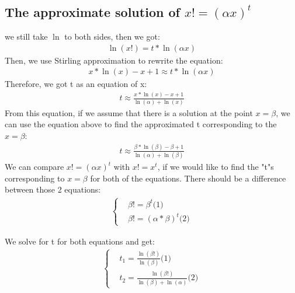\documentclass{article}
\begin{document}
        \subsection{The approximate solution of $x! = (\alpha x) ^ {t}$}
        we still take $\ln$ to both sides, then we got:
            \begin{align*}
               \ln(x!) = t * \ln(\alpha x)
            \end{align*}
        Then, we use Stirling approximation to rewrite the equation:
            \begin{align*}
               x * \ln(x) - x + 1 \approx t * \ln(\alpha x)
            \end{align*}
        Therefore, we got t as an equation of x:
            \begin{align*}
               t \approx \frac{x * \ln(x) - x + 1}{\ln(\alpha) + \ln(x)}
            \end{align*}
        From this equation, if we assume that there is a solution at the point $x = \beta$, we can use the equation above to find the approximated t corresponding to the $x = \beta$:
            \begin{align*}
               t \approx \frac{\beta * \ln(\beta) - \beta + 1}{\ln(\alpha) + \ln(\beta)}
            \end{align*}
        We can compare $x! = (\alpha x) ^ {t}$ with $x! = x ^ {t}$, if we would like to find the "t"s corresponding to $x = \beta$ for both of the equations. There should be a difference between those 2 equations:\\
            \begin{align*}
                \left\{\begin{matrix}
                    & \beta! = \beta ^ {t}\text{(1)} \\ 
                    & \beta! = (\alpha * \beta) ^ {t}\text{(2)} 
                \end{matrix}\right.
            \end{align*}

        We solve for t for both equations and get:
            \begin{align*}
               \left\{\begin{matrix}
                    & t_1 = \frac{\ln(\beta !)}{\ln(\beta)} \text{(1)} \\ 
                    & t_2 = \frac{\ln(\beta !)}{\ln(\beta) + \ln(\alpha)} \text{(2)} 
                \end{matrix}\right.
            \end{align*}
\end{document}
